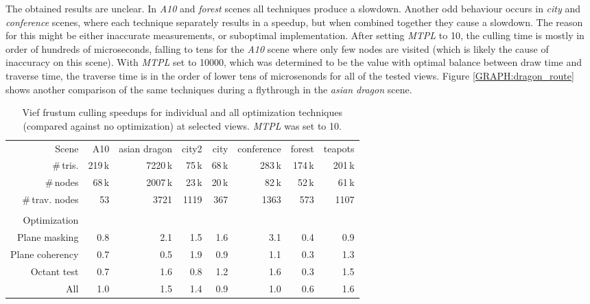 \documentclass[report,11pt]{elsarticle}
\begin{document}
The obtained results are unclear. In \emph{A10} and \emph{forest} scenes all techniques produce a slowdown. Another odd behaviour occurs in \emph{city} and \emph{conference} scenes, where each technique separately results in a speedup, but when combined together they cause a slowdown. The reason for this might be either inaccurate measurements, or suboptimal implementation. After setting \emph{MTPL} to 10, the culling time is mostly in order of hundreds of microseconds, falling to tens for the \emph{A10} scene where only few nodes are visited (which is likely the cause of inaccuracy on this scene). With \emph{MTPL} set to 10000, which was determined to be the value with optimal balance between draw time and traverse time, the traverse time is in the order of lower tens of microsenonds for all of the tested views. Figure \ref{GRAPH:dragon_route} shows another comparison of the same techniques during a flythrough in the \emph{asian dragon} scene. 

\begin{table*}[t]
\begin{center}
\begin{tabular}{| r || r | r | r | r | r | r | r |}
	\hline
	Scene                                   & A10 & asian dragon & city2 & city & conference & forest & teapots \\
	\#\,tris.                               & 219\,k & 7220\,k & 75\,k & 68\,k & 283\,k & 174\,k & 201\,k \\
	\#\,nodes                               & 68\,k & 2007\,k & 23\,k & 20\,k & 82\,k & 52\,k & 61\,k \\
	\#\,trav. nodes                         & 53  & 3721 & 1119 & 367 & 1363  & 573 & 1107 \\
	\diagbox[width=10em]{\\Optimization}{} &&&&&&& \\
\hline
\hline
	Plane masking                           & 0.8 & 2.1 & 1.5 & 1.6 & 3.1 & 0.4 & 0.9 \\
\hline
	Plane coherency                         & 0.7 & 0.5 & 1.9 & 0.9 & 1.1 & 0.3 & 1.3 \\
\hline
	Octant test                             & 0.7 & 1.6 & 0.8 & 1.2 & 1.6 & 0.3 & 1.5 \\
\hline
	All                                     & 1.0 & 1.5 & 1.4 & 0.9 & 1.0 & 0.6 & 1.6 \\
\hline
\end{tabular}
\end{center}
	\caption{Vief frustum culling speedups for individual and all optimization techniques (compared against no optimization) at selected views. \emph{MTPL} was set to 10.}
	\label{TAB:optim}
\end{table*}
\end{document}
